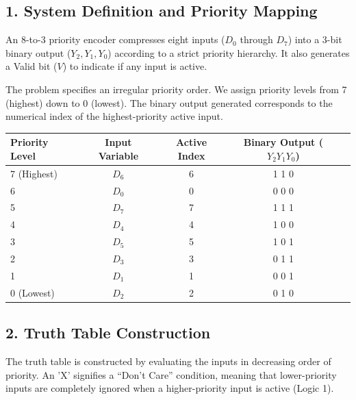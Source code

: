 \documentclass[12pt,a3paper]{article}
\begin{document}
\begin{enumerate}
\begin{tcolorbox}[enhanced,breakable,ansbox,colback=cD!4,colframe=cD,boxrule=0.8pt,arc=5pt,title={\textbf{Answer}},fonttitle=\bfseries\color{white},colbacktitle=cD]
\subsection*{1. System Definition and Priority Mapping}

An 8-to-3 priority encoder compresses eight inputs ($D_0$ through $D_7$) into a 3-bit binary output ($Y_2, Y_1, Y_0$) according to a strict priority hierarchy. It also generates a Valid bit ($V$) to indicate if any input is active. 

The problem specifies an irregular priority order. We assign priority levels from 7 (highest) down to 0 (lowest). The binary output generated corresponds to the numerical index of the highest-priority active input.

\begin{center}
\renewcommand{\arraystretch}{1.2}
\begin{tabular}{lcccc}
\toprule
\textbf{Priority Level} & \textbf{Input Variable} & \textbf{Active Index} & \textbf{Binary Output ($Y_2 Y_1 Y_0$)} \\
\midrule
7 (Highest) & \textbf{$D_6$} & 6 & 1 1 0 \\
6 & \textbf{$D_0$} & 0 & 0 0 0 \\
5 & \textbf{$D_7$} & 7 & 1 1 1 \\
4 & \textbf{$D_4$} & 4 & 1 0 0 \\
3 & \textbf{$D_5$} & 5 & 1 0 1 \\
2 & \textbf{$D_3$} & 3 & 0 1 1 \\
1 & \textbf{$D_1$} & 1 & 0 0 1 \\
0 (Lowest)  & \textbf{$D_2$} & 2 & 0 1 0 \\
\bottomrule
\end{tabular}
\end{center}

\subsection*{2. Truth Table Construction}

The truth table is constructed by evaluating the inputs in decreasing order of priority. An 'X' signifies a ``Don't Care'' condition, meaning that lower-priority inputs are completely ignored when a higher-priority input is active (Logic 1).


\end{tcolorbox}
\end{enumerate}
\end{document}
